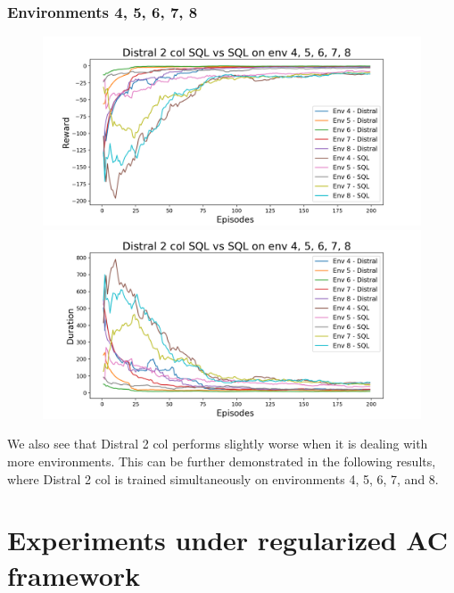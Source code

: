 \documentclass[12pt]{report}
\begin{document}
\subsubsection{Environments 4, 5, 6, 7, 8}
\begin{figure}[H]
\centering
\begin{minipage}{.5\textwidth}
\centering
\includegraphics[width=\textwidth]{figs/d2_col_sql/d2_col_sql_4_5_6_7_8_rwd.png}
\end{minipage}%
\centering
\begin{minipage}{.5\textwidth}
\centering
\includegraphics[width=\textwidth]{figs/d2_col_sql/d2_col_sql_4_5_6_7_8_dur.png}
\end{minipage}%
\end{figure}
We also see that Distral 2 col performs slightly worse when it is dealing with more environments. This can be further demonstrated in the following results, where Distral 2 col is trained simultaneously on environments 4, 5, 6, 7, and 8.

\section{Experiments under regularized AC framework}
\end{document}
